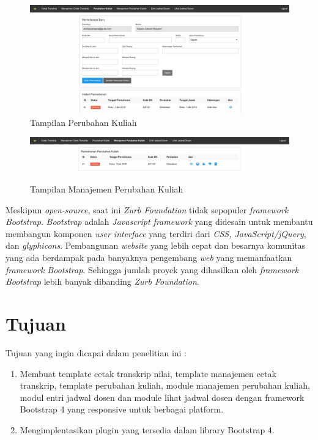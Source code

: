 \documentclass[a4paper,twoside]{article}
\begin{document}
\begin{figure}[ht!]
	\includegraphics [scale=0.5] {Tampilan-Perubahan-Kuliah.PNG}
	\caption{Tampilan Perubahan Kuliah}
\end{figure}

\begin{figure}[ht!]
	\includegraphics [scale=0.5] {Tampilan-Manajemen-Perubahan-Kuliah.PNG}
	\caption{Tampilan Manajemen Perubahan Kuliah}
\end{figure}




Meskipun \textit{open-source}, saat ini \textit{Zurb Foundation} tidak sepopuler \textit{framework} \textit{Bootstrap}. 
\textit{Bootstrap} adalah \textit{ Javascript framework} yang didesain untuk membantu membangun komponen \textit{user interface} yang terdiri dari \textit{CSS, JavaScript/jQuery}, dan \textit{glyphicons}. Pembangunan \textit{website} yang lebih cepat dan besarnya komunitas yang ada berdampak pada banyaknya pengembang \textit{web} yang memanfaatkan \textit{framework Bootstrap}. Sehingga jumlah proyek yang dihasilkan oleh\textit{ framework Bootstrap} lebih banyak dibanding \textit{Zurb Foundation}. 

\section{Tujuan}
Tujuan yang ingin dicapai dalam penelitian ini :
\begin{enumerate}
	\item Membuat template cetak transkrip nilai, template manajemen cetak transkrip, template perubahan kuliah, module manajemen perubahan kuliah, modul entri jadwal dosen dan module lihat jadwal dosen dengan framework Bootstrap 4 yang responsive untuk berbagai platform.
	\item Mengimplentasikan plugin yang tersedia dalam library Bootstrap 4.	
\end{enumerate}
\end{document}
